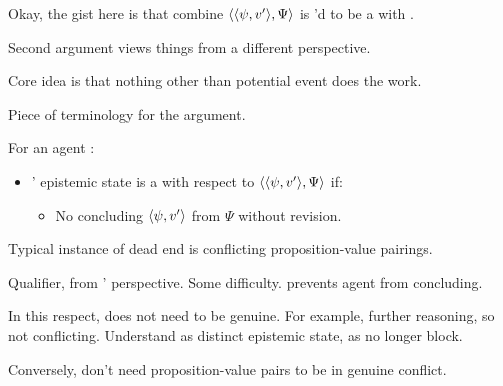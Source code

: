 \begin{note}
  \color{red}
  Okay, the gist here is that combine \(\langle \langle \psi, v' \rangle, \Psi \rangle\) is \ptivityQV{}'d to be a \fc{} with \deadEnd{}.
\end{note}

\begin{note}
  Second argument views things from a different perspective.

  Core idea is that nothing other than potential event does the work.
\end{note}

\begin{note}[A \deadEnd{}]
  Piece of terminology for the argument.

  \begin{definition}[A \deadEnd{0}]
    \label{def:dead-end}
    For an agent \vAgent{}:

    \begin{itemize}
    \item
      \vAgent{}' epistemic state is a \emph{} with respect to \(\langle \langle \psi, v' \rangle, \Psi \rangle\) if:
      \begin{itemize}
      \item
        No concluding \(\langle \psi, v' \rangle\) from \(\Psi\) without revision.
      \end{itemize}
    \end{itemize}
    \vspace{-\baselineskip}
  \end{definition}

  Typical instance of dead end is conflicting proposition-value pairings.

  Qualifier, from \vAgent{}' perspective.
  Some difficulty.
  \deadEnd{} prevents agent from concluding.

  In this respect, \deadEnd{} does not need to be genuine.
  For example, further reasoning, so not conflicting.
  Understand as distinct epistemic state, as no longer block.

  Conversely, don't need proposition-value pairs to be in genuine conflict.
\end{note}



